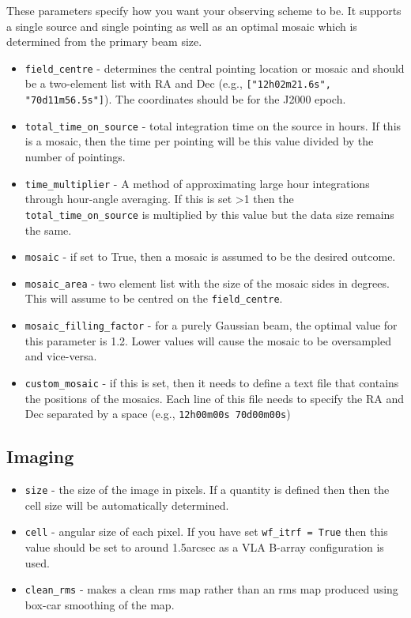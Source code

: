 \documentclass[11pt]{report_jfr}
\begin{document}
These parameters specify how you want your observing scheme to be. It supports a single source and single pointing as well as an optimal mosaic which is determined from the primary beam size.
%
\begin{itemize}
	\item \texttt{field\_centre} - determines the central pointing location or mosaic and should be a two-element list with RA and Dec (e.g., \texttt{["12h02m21.6s", "70d11m56.5s"]}). The coordinates should be for the J2000 epoch.
	\item \texttt{total\_time\_on\_source} - total integration time on the source in hours. If this is a mosaic, then the time per pointing will be this value divided by the number of pointings.
	\item \texttt{time\_multiplier} - A method of approximating large hour integrations through hour-angle averaging. If this is set >1 then the \texttt{total\_time\_on\_source} is multiplied by this value but the data size remains the same.
	\item \texttt{mosaic} - if set to True, then a mosaic is assumed to be the desired outcome.                             
	\item \texttt{mosaic\_area} - two element list with the size of the mosaic sides in degrees. This will assume to be centred on the \texttt{field\_centre}.         
	\item \texttt{mosaic\_filling\_factor} - for a purely Gaussian beam, the optimal value for this parameter is 1.2. Lower values will cause the mosaic to be oversampled and vice-versa. 
	\item \texttt{custom\_mosaic} - if this is set, then it needs to define a text file that contains the positions of the mosaics. Each line of this file needs to specify the RA and Dec separated by a space (e.g., \texttt{12h00m00s 70d00m00s})
\end{itemize}

\subsection{Imaging}
%
\begin{itemize}
	\item\texttt{size} - the size of the image in pixels. If a quantity is defined then then the cell size will be automatically determined.
	\item \texttt{cell} - angular size of each pixel. If you have set \texttt{wf\_itrf = True} then this value should be set to around 1.5arcsec as a VLA B-array configuration is used.
	\item \texttt{clean\_rms} - makes a clean rms map rather than an rms map produced using box-car smoothing of the map.
\end{itemize}
\end{document}
